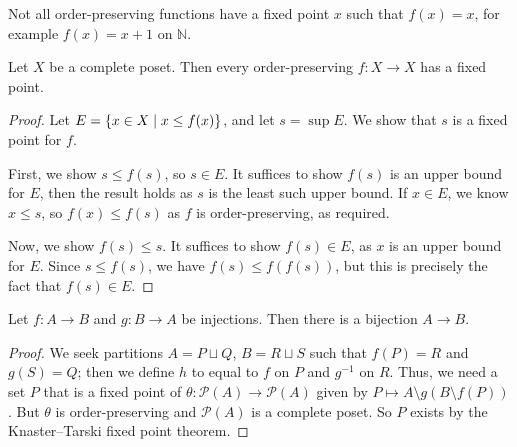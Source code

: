 Not all order-preserving functions have a fixed point \( x \) such that \( f(x) = x \), for example \( f(x) = x + 1 \) on \( \mathbb N \).
\begin{theorem}
    Let \( X \) be a complete poset.
    Then every order-preserving \( f \colon X \to X \) has a fixed point.
\end{theorem}
\begin{proof}
    Let \( E = \qty{x \in X \mid x \leq f(x)} \), and let \( s = \sup E \).
    We show that \( s \) is a fixed point for \( f \).

    First, we show \( s \leq f(s) \), so \( s \in E \).
    It suffices to show \( f(s) \) is an upper bound for \( E \), then the result holds as \( s \) is the least such upper bound.
    If \( x \in E \), we know \( x \leq s \), so \( f(x) \leq f(s) \) as \( f \) is order-preserving, as required.

    Now, we show \( f(s) \leq s \).
    It suffices to show \( f(s) \in E \), as \( x \) is an upper bound for \( E \).
    Since \( s \leq f(s) \), we have \( f(s) \leq f(f(s)) \), but this is precisely the fact that \( f(s) \in E \).
\end{proof}
\begin{corollary}
    Let \( f \colon A \to B \) and \( g \colon B \to A \) be injections.
    Then there is a bijection \( A \to B \).
\end{corollary}
\begin{proof}
    We seek partitions \( A = P \sqcup Q \), \( B = R \sqcup S \) such that \( f(P) = R \) and \( g(S) = Q \); then we define \( h \) to equal to \( f \) on \( P \) and \( g^{-1} \) on \( R \).
    Thus, we need a set \( P \) that is a fixed point of \( \theta \colon \mathcal P(A) \to \mathcal P(A) \) given by \( P \mapsto A \setminus g(B \setminus f(P)) \).
    But \( \theta \) is order-preserving and \( \mathcal P(A) \) is a complete poset.
    So \( P \) exists by the Knaster--Tarski fixed point theorem.
\end{proof}

